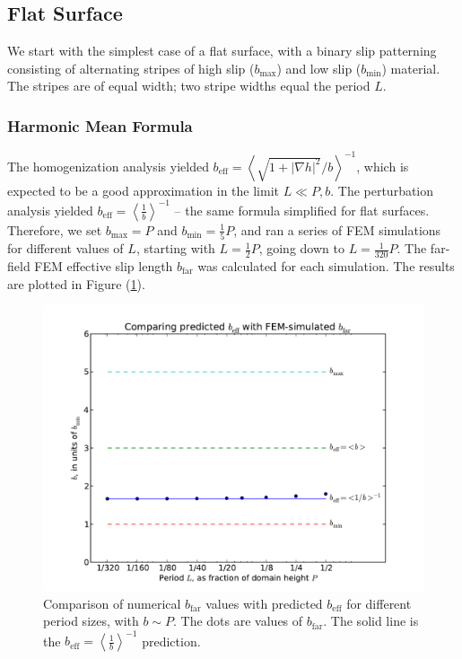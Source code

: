 \documentclass[12pt, a4paper, twoside, openright]{book}
\newcommand{\beff}{\ensuremath{b_{\mathrm{eff}}}}
\newcommand{\bmin}{\ensuremath{b_{\mathrm{min}}}}
\newcommand{\bmax}{\ensuremath{b_{\mathrm{max}}}}
\newcommand{\bfar}{\ensuremath{b_{\mathrm{far}}}}
\newcommand{\beffh}{\ensuremath{b_{\mathrm{eff}}} = \left< \frac{1}{b} \right>^{-1} }
\newcommand{\beffha}{\ensuremath{b_{\mathrm{eff}}} = \left< \sqrt{1 + |\nabla h|^2} / {b} \right>^{-1} }
\begin{document}
\subsection{Flat Surface}

We start with the simplest case of a flat surface, with a binary slip patterning consisting of alternating stripes of high slip ($\bmax$) and low slip ($\bmin$) material.  The stripes are of equal width; two stripe widths equal the period $L$.

\clearpage
\subsubsection{Harmonic Mean Formula}
The homogenization analysis yielded $\beffha$, which is expected to be a good approximation in the limit $L \ll P,b$.  The perturbation analysis yielded $\beffh$ --  the same formula simplified for flat surfaces.  Therefore, we set $\bmax = P$ and $\bmin = \frac{1}{5}P$, and ran a series of FEM simulations for different values of $L$, starting with $L = \frac{1}{2}P$, going down to $L = \frac{1}{320}P$.  The far-field FEM effective slip length $\bfar$ was calculated for each simulation.  The results are plotted in Figure (\ref{FEMplotflatL}).

\begin{figure}[ht]
\includegraphics[scale=0.595]{Lund_Thesis_FEM_plot_flat_L}
\caption{Comparison of numerical $\bfar$ values with predicted $\beff$ for different period sizes, with $b \sim P$.  The dots are values of $\bfar$.  The solid line is the $\beffh$ prediction.}\label{FEMplotflatL}
\end{figure}
\end{document}
